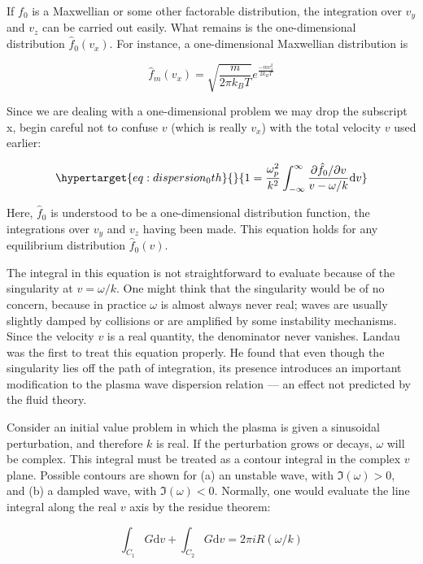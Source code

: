 \documentclass[
  notoc %
]{tufte-book}
\begin{document}
If \(f_0\) is a Maxwellian or some other factorable distribution, the
integration over \(v_y\) and \(v_z\) can be carried out easily. What
remains is the one-dimensional distribution \(\hat{f}_0(v_x)\). For
instance, a one-dimensional Maxwellian distribution is

\[
\hat{f}_m(v_x) = \sqrt{\frac{m}{2\pi k_B T}} e^{\frac{-mv_x^2}{2 k_B T}}
\]

Since we are dealing with a one-dimensional problem we may drop the
subscript x, begin careful not to confuse \(v\) (which is really
\(v_x\)) with the total velocity \(v\) used earlier:

\begin{equation}\protect\hypertarget{eq:dispersion_0th}{}{
1 = \frac{\omega_p^2}{k^2}\int_{-\infty}^{\infty}\frac{\partial \hat{f}_0/\partial v}{v - \omega/k}\mathrm{d}v
}\label{eq:dispersion_0th}\end{equation}

Here, \(\hat{f}_0\) is understood to be a one-dimensional distribution
function, the integrations over \(v_y\) and \(v_z\) having been made.
This equation holds for any equilibrium distribution \(\hat{f}_0(v)\).

The integral in this equation is not straightforward to evaluate because
of the singularity at \(v=\omega/k\). One might think that the
singularity would be of no concern, because in practice \(\omega\) is
almost always never real; waves are usually slightly damped by
collisions or are amplified by some instability mechanisms. Since the
velocity \(v\) is a real quantity, the denominator never vanishes.
Landau was the first to treat this equation properly. He found that even
though the singularity lies off the path of integration, its presence
introduces an important modification to the plasma wave dispersion
relation --- an effect not predicted by the fluid theory.

Consider an initial value problem in which the plasma is given a
sinusoidal perturbation, and therefore \(k\) is real. If the
perturbation grows or decays, \(\omega\) will be complex. This integral
must be treated as a contour integral in the complex \(v\) plane.
Possible contours are shown for (a) an unstable wave, with
\(\Im(\omega) > 0\), and (b) a dampled wave, with \(\Im(\omega) < 0\).
Normally, one would evaluate the line integral along the real \(v\) axis
by the residue theorem:

\[
\int_{C_1} G \mathrm{d}v + \int_{C_2} G \mathrm{d}v = 2\pi i R(\omega/k)
\]
\end{document}
